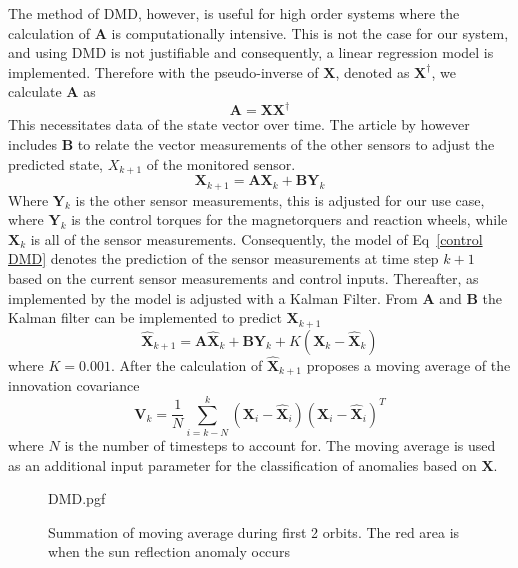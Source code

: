 The method of DMD, however, is useful for high order systems where the calculation of $\mathbf{A}$ is computationally intensive. This is not the case for our system, and using DMD is not justifiable and consequently, a linear regression model is implemented. Therefore with the pseudo-inverse of $\mathbf{X}$, denoted as $\mathbf{X^{\dagger}}$, we calculate $\mathbf{A}$ as
\begin{equation}
	\mathbf{A} = \mathbf{X}\mathbf{X^{\dagger}}
\end{equation}
This necessitates data of the state vector over time. The article by \cite{DeSilva2020} however includes $\mathbf{B}$ to relate the vector measurements of the other sensors to adjust the predicted state, $X_{k+1}$ of the monitored sensor. 
\begin{equation}
	\mathbf{X}_{k+1} = \mathbf{AX}_k + \mathbf{BY}_k
	\label{control DMD}
\end{equation}
Where $\mathbf{Y}_k$ is the other sensor measurements, this is adjusted for our use case, where $\mathbf{Y}_k$ is the control torques for the magnetorquers and reaction wheels, while $\mathbf{X}_k$ is all of the sensor measurements. Consequently, the model of Eq~\ref{control DMD} denotes the prediction of the sensor measurements at time step $k+1$ based on the current sensor measurements and control inputs.
Thereafter, as implemented by \cite{DeSilva2020} the model is adjusted with a Kalman Filter. From $\mathbf{A}$ and $\mathbf{B}$ the Kalman filter can be implemented to predict $\mathbf{X}_{k+1}$
\begin{equation}
	\hat{\mathbf{X}}_{k+1} = \mathbf{A}\hat{\mathbf{X}}_k + \mathbf{B}\mathbf{Y}_k + K(\mathbf{X}_k - \hat{\mathbf{X}}_k)
\end{equation}
where $K = 0.001$. After the calculation of $\hat{\mathbf{X}}_{k+1}$ \cite{DeSilva2020} proposes a moving average of the innovation covariance
\begin{equation}
	\mathbf{V}_k = \frac{1}{N} \sum_{i=k-N}^k (\mathbf{X}_i - \hat{\mathbf{X}}_i)(\mathbf{X}_i - \hat{\mathbf{X}}_i)^T
\end{equation}
where $N$ is the number of timesteps to account for. The moving average is used as an additional input parameter for the classification of anomalies based on $\mathbf{X}$.

\begin{figure}[!htb]
	\centering
	
	{DMD.pgf}
	
	\caption{Summation of moving average during first 2 orbits. The red area is when the sun reflection anomaly occurs}
	\label{fig:reflectionDMD}
\end{figure}

